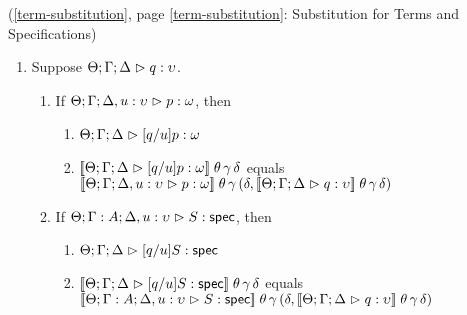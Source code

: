 \begin{lemma*}{(\ref{term-substitution}, page \ref{term-substitution}: Substitution for Terms and Specifications)}
\begin{enumerate}
\begin{enumerate}
\begin{enumerate}
        \end{enumerate}
  \item If $\judgeS[\Theta; \Gamma, x:A; \Delta]{S}$, 
        then 
        \begin{enumerate}
        \item $\judgeS[\Theta; \Gamma; \Delta]{[e/x]S}$.
        \item $\interp{\judgeS[\Theta; \Gamma; \Delta]{[e/x]S}}\;\theta\,\gamma\,\delta$ equals \\
              $\interp{\judgeS[\Theta; \Gamma, x:A; \Delta]{S}}\;\theta\,(\gamma, \interp{\judgeE{\Gamma}{e}{A}}\;\theta\;\gamma)\,\delta$
        \end{enumerate}
  \end{enumerate}
\item Suppose $\judgeA{q}{\upsilon}$.
  \begin{enumerate}
  \item If $\judgeA[\Theta; \Gamma; \Delta, u:\upsilon]{p}{\omega}$, 
        then 
        \begin{enumerate}
          \item $\judgeA[\Theta; \Gamma; \Delta]{[q/u]p}{\omega}$
          \item $\interp{\judgeA[\Theta; \Gamma; \Delta]{[q/u]p}{\omega}}\;\theta\,\gamma\,\delta$ equals \\
                $\interp{\judgeA[\Theta; \Gamma; \Delta, u:\upsilon]{p}{\omega}}\;\theta\,\gamma\,(\delta, \interp{\judgeA{q}{\upsilon}}\;\theta\,\gamma\,\delta)$
        \end{enumerate}
      \item If $\judgeS[\Theta; \Gamma:A; \Delta, u:\upsilon]{S}$, 
        then 
        \begin{enumerate}
          \item $\judgeS[\Theta; \Gamma; \Delta]{[q/u]S}$ 
          \item $\interp{\judgeS[\Theta; \Gamma; \Delta]{[q/u]S}}\;\theta\,\gamma\,\delta$ equals \\
                $\interp{\judgeS[\Theta; \Gamma:A; \Delta, u:\upsilon]{S}}\;\theta\,\gamma\,(\delta, \interp{\judgeA{q}{\upsilon}}\;\theta\,\gamma\,\delta)$
        \end{enumerate}
  \end{enumerate}

\end{enumerate}
\end{lemma*}
